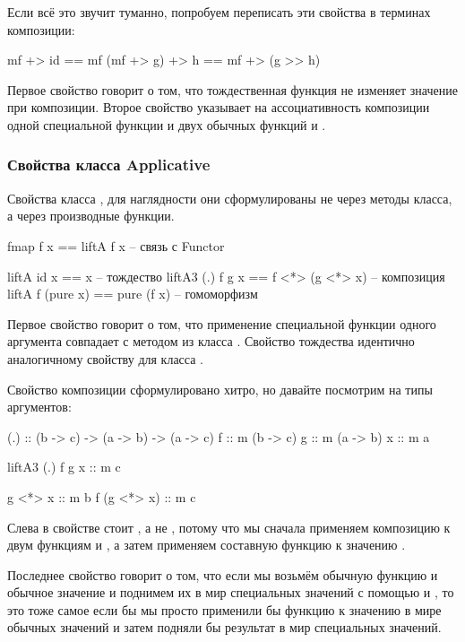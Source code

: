 Если всё это звучит туманно, попробуем переписать эти свойства в
терминах композиции:


\begin{code}
mf +> id         == mf
(mf +> g) +> h   == mf +> (g >> h)
\end{code}

Первое свойство говорит о том, что тождественная функция не изменяет
значение при композиции. Второе свойство указывает на ассоциативность
композиции одной специальной функции  и двух обычных функций
 и .

\subsubsection{Свойства класса Applicative}

Свойства класса , для наглядности они сформулированы не
через методы класса, а через производные функции.


\begin{code}
fmap f x            == liftA f x             -- связь с Functor

liftA  id x         == x                     -- тождество
liftA3 (.) f g x    == f <*> (g <*> x)       -- композиция 
liftA  f (pure x)   == pure (f x)            -- гомоморфизм
\end{code}

Первое свойство говорит о том, что применение специальной функции одного
аргумента совпадает с методом  из класса . Свойство
тождества идентично аналогичному свойству для класса .

Свойство композиции сформулировано хитро, но давайте посмотрим на типы
аргументов:


\begin{code}
(.) :: (b -> c) -> (a -> b) -> (a -> c)
f   :: m (b -> c)
g   :: m (a -> b)    
x   :: m a

liftA3 (.) f g x :: m c

g <*> x      :: m b
f (g <*> x)  :: m c
\end{code}

Слева в свойстве стоит , а не , потому что мы
сначала применяем композицию  к двум функциям  и , а
затем применяем составную функцию к значению .

Последнее свойство говорит о том, что если мы возьмём обычную функцию и
обычное значение и поднимем их в мир специальных значений с помощью
 и , то это тоже самое если бы мы просто применили бы
функцию  к значению в мире обычных значений и затем подняли бы
результат в мир специальных значений.

